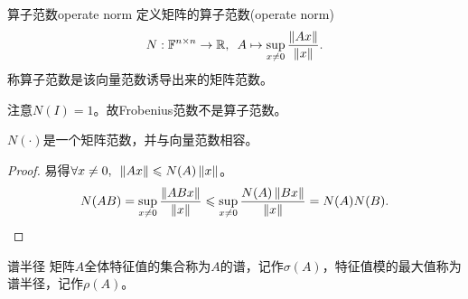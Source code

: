 \begin{definition}
    {算子范数}{operate norm}
    定义矩阵的算子范数(operate norm)
    \begin{equation}
        N:\mathbb F^{n\times n}\to\mathbb R,\enspace A\mapsto\sup_{x\neq 0}\frac{\left\lVert Ax\right\rVert}{\left\lVert x\right\rVert}.
    \end{equation}
    称算子范数是该向量范数诱导出来的矩阵范数。
\end{definition}

\begin{remark}
    注意$N(I)=1$。故Frobenius范数不是算子范数。
\end{remark}

\begin{theorem}
    {}{}
    $N(\cdot)$是一个矩阵范数，并与向量范数相容。 
\end{theorem}

\begin{proof}
    易得$\forall x\neq 0,\enspace\left\lVert Ax\right\rVert\leqslant N(A)\left\lVert x\right\rVert$。
    \[
        N(AB)=\sup_{x\neq 0}\frac{\left\lVert ABx\right\rVert}{\left\lVert x\right\rVert}\leqslant\sup_{x\neq 0}\frac{N(A)\left\lVert Bx\right\rVert}{\left\lVert x\right\rVert}=N(A)N(B).
        \qedhere
    \]
\end{proof}

\begin{definition}
    {谱半径}{}
    矩阵$A$全体特征值的集合称为$A$的谱，记作$\sigma(A)$，特征值模的最大值称为谱半径，记作$\rho(A)$。
\end{definition}

